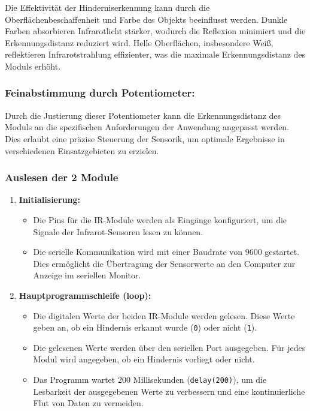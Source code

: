 \documentclass{vorlage-design-main}
\begin{document}
Die Effektivität der Hinderniserkennung kann durch die
Oberflächenbeschaffenheit und Farbe des Objekts beeinflusst werden.
Dunkle Farben absorbieren Infrarotlicht stärker, wodurch die Reflexion
minimiert und die Erkennungsdistanz reduziert wird. Helle Oberflächen,
insbesondere Weiß, reflektieren Infrarotstrahlung effizienter, was die
maximale Erkennungsdistanz des Moduls erhöht.

\hypertarget{feinabstimmung-durch-potentiometer}{%
\subsubsection{Feinabstimmung durch
Potentiometer:}\label{feinabstimmung-durch-potentiometer}}

Durch die Justierung dieser Potentiometer kann die Erkennungsdistanz des
Moduls an die spezifischen Anforderungen der Anwendung angepasst werden.
Dies erlaubt eine präzise Steuerung der Sensorik, um optimale Ergebnisse
in verschiedenen Einsatzgebieten zu erzielen.

\hypertarget{auslesen-der-2-module}{%
\subsubsection{Auslesen der 2 Module}\label{auslesen-der-2-module}}

\begin{enumerate}
\def\labelenumi{\arabic{enumi}.}

\item
  \textbf{Initialisierung:}

  \begin{itemize}
  
  \item
    Die Pins für die IR-Module werden als Eingänge konfiguriert, um die
    Signale der Infrarot-Sensoren lesen zu können.
  \item
    Die serielle Kommunikation wird mit einer Baudrate von 9600
    gestartet. Dies ermöglicht die Übertragung der Sensorwerte an den
    Computer zur Anzeige im seriellen Monitor.
  \end{itemize}
\item
  \textbf{Hauptprogrammschleife (loop):}

  \begin{itemize}
  
  \item
    Die digitalen Werte der beiden IR-Module werden gelesen. Diese Werte
    geben an, ob ein Hindernis erkannt wurde
    (\verb|0|) oder nicht
    (\verb|1|).
  \item
    Die gelesenen Werte werden über den seriellen Port ausgegeben. Für
    jedes Modul wird angegeben, ob ein Hindernis vorliegt oder nicht.
  \item
    Das Programm wartet 200 Millisekunden
    (\verb|delay(200)|), um die Lesbarkeit der
    ausgegebenen Werte zu verbessern und eine kontinuierliche Flut von
    Daten zu vermeiden.
  \end{itemize}
\end{enumerate}
\end{document}
